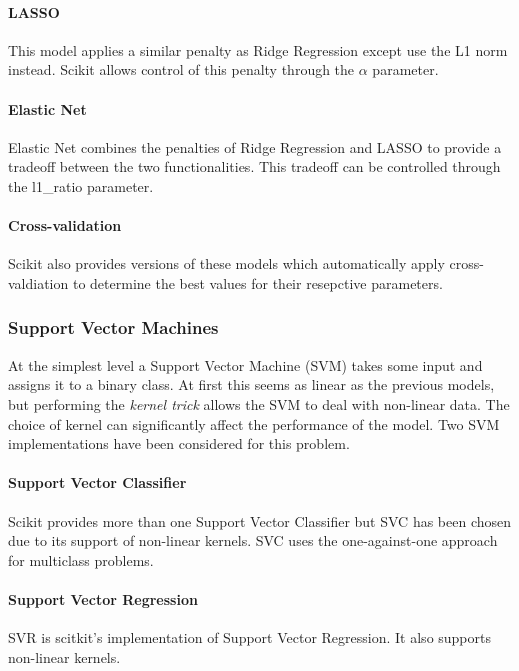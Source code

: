 \paragraph*{LASSO}
This model applies a similar penalty as Ridge Regression except use the L1 norm instead. Scikit allows control of this penalty through the $\alpha$ parameter.

\paragraph*{Elastic Net}
Elastic Net combines the penalties of Ridge Regression and LASSO to provide a tradeoff between the two functionalities. This tradeoff can be controlled through the l1\_ratio parameter.

\paragraph*{Cross-validation}
Scikit also provides versions of these models which automatically apply cross-valdiation to determine the best values for their resepctive parameters.

\subsubsection{Support Vector Machines}
At the simplest level a Support Vector Machine (SVM) takes some input and assigns it to a binary class. At first this seems as linear as the previous models, but performing the {\it kernel trick} allows the SVM to deal with non-linear data. The choice of kernel can significantly affect the performance of the model. Two SVM implementations have been considered for this problem.

\paragraph*{Support Vector Classifier}
Scikit provides more than one Support Vector Classifier but SVC has been chosen due to its support of non-linear kernels. SVC uses the one-against-one approach for multiclass problems.

\paragraph*{Support Vector Regression}
SVR is scitkit's implementation of Support Vector Regression. It also supports non-linear kernels.

